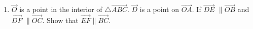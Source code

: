 \renewcommand{\theequation}{\theenumi}
\begin{enumerate}[label=\thesection.\arabic*.,ref=\thesection.\theenumi]

\item $\vec{O}$ is a point in the interior of $\triangle \vec{ABC}$. $\vec{D}$ is a point on $\vec{OA}$. If $\vec{DE}$ $\parallel \vec{OB}$ and $\vec{DF}$ $\parallel \vec{OC}$. Show that $\vec{EF} \parallel \vec{BC}$.
\end{enumerate}


